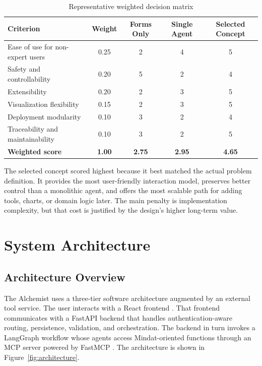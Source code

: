 \documentclass[12pt,oneside]{report}
\begin{document}
\begin{table}[H]
\centering
\caption{Representative weighted decision matrix}
\label{tab:decisionmatrix}
\begin{tabular}{p{2.15in} c c c c}
\toprule
\textbf{Criterion} & \textbf{Weight} & \textbf{Forms Only} & \textbf{Single Agent} & \textbf{Selected Concept} \\
\midrule
Ease of use for non-expert users & 0.25 & 2 & 4 & 5 \\
Safety and controllability & 0.20 & 5 & 2 & 4 \\
Extensibility & 0.20 & 2 & 3 & 5 \\
Visualization flexibility & 0.15 & 2 & 3 & 5 \\
Deployment modularity & 0.10 & 3 & 2 & 4 \\
Traceability and maintainability & 0.10 & 3 & 2 & 5 \\
\midrule
\textbf{Weighted score} & \textbf{1.00} & \textbf{2.75} & \textbf{2.95} & \textbf{4.65} \\
\bottomrule
\end{tabular}
\end{table}

The selected concept scored highest because it best matched the actual problem definition. It provides the most user-friendly interaction model, preserves better control than a monolithic agent, and offers the most scalable path for adding tools, charts, or domain logic later. The main penalty is implementation complexity, but that cost is justified by the design's higher long-term value.

\section{System Architecture}

\subsection{Architecture Overview}

The Alchemist uses a three-tier software architecture augmented by an external tool service. The user interacts with a React frontend \citep{react}. That frontend communicates with a FastAPI backend \citep{fastapi} that handles authentication-aware routing, persistence, validation, and orchestration. The backend in turn invokes a LangGraph workflow \citep{langgraph} whose agents access Mindat-oriented functions through an MCP server powered by FastMCP \citep{fastmcp}. The architecture is shown in Figure~\ref{fig:architecture}.
\end{document}
